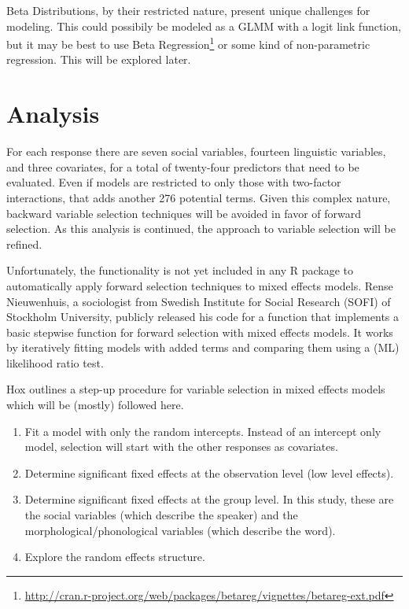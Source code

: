 \documentclass[a4paper]{article}
\begin{document}
Beta Distributions, by their restricted nature,  present unique
challenges for modeling.  This could possibily be modeled as a GLMM
with a logit link function, but it may be best to use Beta Regression\footnote{
  \url{http://cran.r-project.org/web/packages/betareg/vignettes/betareg-ext.pdf}
} or some kind of non-parametric regression.  This will be explored later.

\newpage
\section*{Analysis}
For each response there are seven social variables, fourteen linguistic
variables, and three covariates, for a total of twenty-four predictors
that need to be evaluated. Even if models are restricted to only those
with two-factor interactions, that adds another 276 potential terms.
Given this complex nature, backward variable selection
techniques will be avoided in favor of forward
selection.  As this analysis is continued, the approach to variable
selection will be refined.

Unfortunately, the functionality is not yet included in any R package
to automatically apply forward selection techniques to mixed effects
models.  Rense Nieuwenhuis, a sociologist from Swedish Institute for
Social Research (SOFI) of Stockholm University,
publicly released his code for a function that implements a basic
stepwise function for forward selection with mixed effects models.  It
works by iteratively fitting models with added terms and comparing
them using a (ML) likelihood ratio test\footnotemark.



Hox outlines a step-up procedure for variable selection in
mixed effects models which will be (mostly) followed here\footnotemark.
\begin{enumerate}
  \item Fit a model with only the random intercepts.  Instead of an
    intercept only model, selection will start with the other
    responses as covariates.
  \item Determine significant fixed effects at the observation level
    (low level effects).
  \item Determine significant fixed effects at the group level.  In
    this study, these are the social variables (which describe the
    speaker) and the morphological/phonological variables (which
    describe the word).
  \item Explore the random effects structure.
\end{enumerate}
\end{document}
